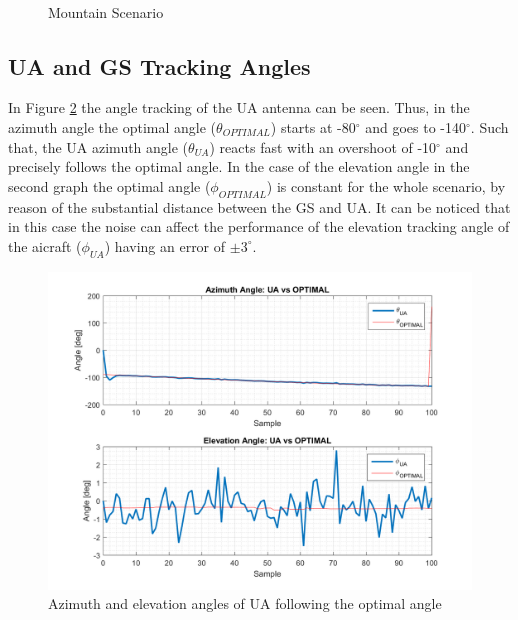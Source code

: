 \begin{figure}[H]
	\\
	\caption{Mountain Scenario}
	\label{fig:s4_map}
\end{figure}

\subsection*{UA and GS Tracking Angles}
In Figure \ref{fig:s4_ua} the angle tracking of the UA antenna can be seen. Thus, in the azimuth angle the optimal angle ($\theta_{OPTIMAL}$) starts at -80$^{\circ}$ and goes to -140$^{\circ}$. Such that, the UA azimuth angle ($\theta_{UA}$) reacts fast with an overshoot of -10$^{\circ}$ and precisely follows the optimal angle. In the case of the elevation angle in the second graph the optimal angle ($\phi_{OPTIMAL}$) is constant for the whole scenario, by reason of the substantial distance between the GS and UA. It can be noticed that in this case the noise can affect the performance of the elevation tracking angle of the aicraft ($\phi_{UA}$) having an error of $\pm3^{\circ}$. 

\begin{figure}[H]
	\centering
	\includegraphics[scale=0.8]{figures/s4_ua.png}
	\caption{Azimuth and elevation angles of UA following the optimal angle}
	\label{fig:s4_ua}
\end{figure}

